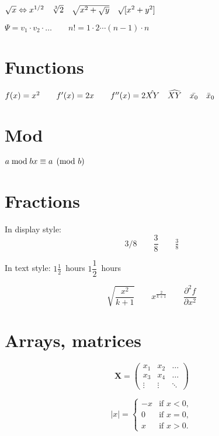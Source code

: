 \documentclass{article}
\begin{document}
$\sqrt{x} \Leftrightarrow x^{1/2}
 \quad \sqrt[3]{2}
 \quad \sqrt{x^{2} + \sqrt{y}}
 \quad \surd[x^2 + y^2]$

$\Psi = v_1 \cdot v_2
 \cdot \ldots \qquad
 n! = 1 \cdot 2
 \cdots (n-1) \cdot n$

\section{Functions}

$f(x) = x^2 \qquad f'(x)
 = 2x \qquad f''(x) = 2\\[5pt]
 \hat{XY} \quad \widehat{XY}
 \quad \bar{x_0} \quad \bar{x}_0$
 
 \section{Mod}
 
$a\bmod b \\
 x\equiv a \pmod{b}$

\section{Fractions}

In display style:
\begin{equation*}
  3/8 \qquad \frac{3}{8}
  \qquad \tfrac{3}{8}
\end{equation*}

In text style:
$1\frac{1}{2}$~hours \qquad
$1\dfrac{1}{2}$~hours

\begin{equation*}
  \sqrt{\frac{x^2}{k+1}}\qquad
  x^\frac{2}{k+1}\qquad
  \frac{\partial^2f}
  {\partial x^2}
\end{equation*}

\section{Arrays, matrices}


  \begin{equation*}
    \mathbf{X} = \left(
      \begin{array}{ccc}
        x_1 & x_2 & \ldots \\
        x_3 & x_4 & \ldots \\
        \vdots & \vdots & \ddots
      \end{array} \right)
  \end{equation*}

\bigskip
\begin{equation*}
  |x| = \left\{
    \begin{array}{rl}
      -x & \text{if } x < 0,\\
      0 & \text{if } x = 0,\\
      x & \text{if } x > 0.
    \end{array} \right.
\end{equation*}
\end{document}
